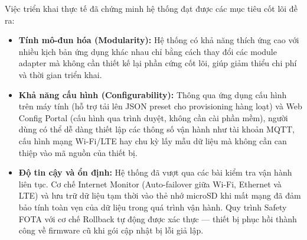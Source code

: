 Việc triển khai thực tế đã chứng minh hệ thống đạt được các mục tiêu cốt lõi đề ra:

\begin{itemize}
    \item \textbf{Tính mô-đun hóa (Modularity):} Hệ thống có khả năng thích ứng cao với nhiều kịch bản ứng dụng khác nhau chỉ bằng cách thay đổi các module adapter mà không cần thiết kế lại phần cứng cốt lõi, giúp giảm thiểu chi phí và thời gian triển khai.
    \item \textbf{Khả năng cấu hình (Configurability):} Thông qua ứng dụng cấu hình trên máy tính (hỗ trợ tải lên JSON preset cho provisioning hàng loạt) và Web Config Portal (cấu hình qua trình duyệt, không cần cài phần mềm), người dùng có thể dễ dàng thiết lập các thông số vận hành như tài khoản MQTT, cấu hình mạng Wi-Fi/LTE hay chu kỳ lấy mẫu dữ liệu mà không cần can thiệp vào mã nguồn của thiết bị.
    \item \textbf{Độ tin cậy và ổn định:} Hệ thống đã vượt qua các bài kiểm tra vận hành liên tục. Cơ chế Internet Monitor (Auto-failover giữa Wi-Fi, Ethernet và LTE) và lưu trữ dữ liệu tạm thời vào thẻ nhớ microSD khi mất mạng đã đảm bảo tính toàn vẹn của dữ liệu trong quá trình vận hành. Quy trình Safety FOTA với cơ chế Rollback tự động được xác thực — thiết bị phục hồi thành công về firmware cũ khi gói cập nhật bị lỗi giả lập.
\end{itemize}
